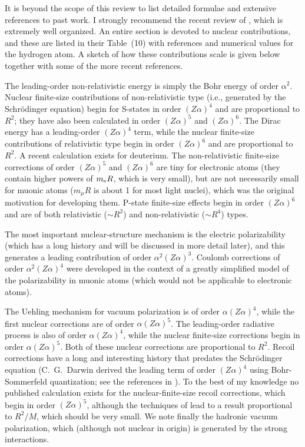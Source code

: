 \documentclass{svmult}
\begin{document}
It is beyond the scope of this review to list detailed formulae and extensive
references to past work. I strongly recommend the recent review of
\cite{review}, which is extremely well organized. An entire section is devoted
to nuclear contributions, and these are listed in their Table~(10) with
references and numerical values for the hydrogen atom. A sketch of how these
contributions scale is given below together with some of the more recent
references.

The leading-order non-relativistic energy is simply the Bohr energy of order
$\alpha^2$. Nuclear finite-size
contributions of non-relativistic type (i.e., generated by the Schr\"odinger
equation) begin for S-states in order $(Z \alpha)^4$\cite{KKS} and are
proportional to $R^2$; they have also been calculated in order $(Z \alpha)^5$
and $(Z \alpha)^6$\cite{fs1,fs2}. The Dirac energy has a leading-order $(Z
\alpha)^4$ term, while the nuclear finite-size contributions of relativistic
type begin in order $(Z \alpha)^6$ and are proportional to $R^2$. A recent
calculation exists for deuterium\cite{ho-size}. The non-relativistic finite-size
corrections of order $(Z \alpha)^5$ and $(Z \alpha)^6$ are tiny for electronic
atoms (they contain higher powers of $m_{\rm e} R$, which is very small), but
are not necessarily small for muonic atoms ($m_{\mu} R$ is about 1 for most 
light nuclei), which was the original motivation for developing them. P-state
finite-size effects begin in order $(Z \alpha)^6$ and are of both relativistic
($\sim R^2$) and non-relativistic ($\sim R^4$) types.

The most important nuclear-structure mechanism is the electric
polarizability (which has a long history and will
be discussed in more detail later), and this generates a leading contribution of
order $\alpha^2 (Z \alpha)^3$. Coulomb corrections
 of order $\alpha^2 (Z
\alpha)^4$ were developed in the context of a greatly simplified model of the
polarizability in muonic atoms\cite{He4-x} (which would not be applicable to
electronic atoms).

The Uehling mechanism for vacuum polarization is of order $\alpha (Z \alpha)^4$,
while the first nuclear corrections are of order $\alpha (Z
\alpha)^5$\cite{fs-vp,fs-vp-h,fs-rad, fs-rad-p}. The leading-order radiative
process is also of order $\alpha (Z \alpha)^4$, while the nuclear finite-size
corrections begin in order $\alpha (Z \alpha)^5$\cite{fs-rad,fs-rad-p}. Both of
these nuclear corrections are proportional to $R^2$. Recoil corrections have a
long and interesting history that predates the Schr\"odinger equation (C.\ G.\
Darwin derived the leading term of order $(Z \alpha)^4$ using Bohr-Sommerfeld
quantization; see the references in \cite{breit}). To the best of my knowledge
no published calculation exists for the nuclear-finite-size recoil corrections,
which begin in order $(Z \alpha)^5$, although the techniques of \cite{GY} lead 
to a result proportional to $R^2/M$, which should be very small. We note finally
the hadronic vacuum polarization\index{Vacuum~polarization!hadronic}, which
(although not nuclear in origin) is generated by the strong
interactions\cite{had-vp}.
\end{document}
